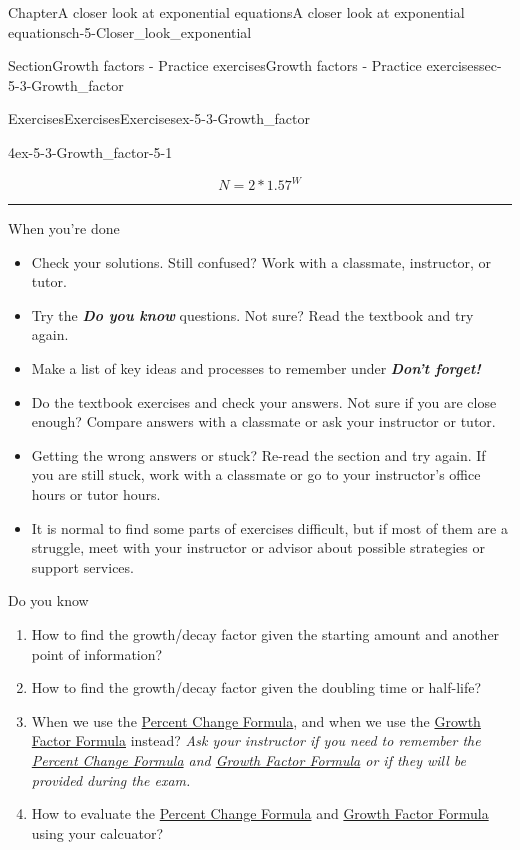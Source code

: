 \documentclass[twoside,11pt,]{book}
\newcommand{\alert}[1]{\textbf{\textit{#1}}}
\newlength{\workspacestrutwidth}
\numberwithin{equation}{section}
\begin{document}
\begin{chapterptx}{Chapter}{A closer look at exponential equations}{}{A closer look at exponential equations}{}{}{ch-5-Closer_look_exponential}
\begin{sectionptx}{Section}{Growth factors - Practice exercises}{}{Growth factors - Practice exercises}{}{}{sec-5-3-Growth_factor}
\begin{exercises-subsection-numberless}{Exercises}{Exercises}{}{Exercises}{}{}{ex-5-3-Growth_factor}
\begin{divisionexercise}{4}{}{}{ex-5-3-Growth_factor-5-1}
\begin{enumerate}[label=(\alph*),ref=\alph*]
\begin{equation*}
N = 2 \ast 1.57^W
\end{equation*}
%
\par\rule{\workspacestrutwidth}{1.5in}%
\end{enumerate}%
\end{divisionexercise}%
\end{exercises-subsection-numberless}
\begin{conclusion}{When you're done \textellipsis{}}%
%
\begin{itemize}[label=\textbullet]
\item{}Check your solutions. Still confused? Work with a classmate, instructor, or tutor.%
\item{}Try the \alert{Do you know} questions. Not sure? Read the textbook and try again.%
\item{}Make a list of key ideas and processes to remember under \alert{Don't forget!}%
\item{}Do the textbook exercises and check your answers. Not sure if you are close enough? Compare answers with a classmate or ask your instructor or tutor.%
\item{}Getting the wrong answers or stuck? Re-read the section and try again. If you are still stuck, work with a classmate or go to your instructor's office hours or tutor hours.%
\item{}It is normal to find some parts of exercises difficult, but if most of them are a struggle, meet with your instructor or advisor about possible strategies or support services.%
\end{itemize}
%
\end{conclusion}%
\begin{conclusion}{Do you know \textellipsis{}}%
%
\begin{enumerate}[label={\Alph*.}]
\item{}How to find the growth\slash{}decay factor given the starting amount and another point of information?%
\item{}How to find the growth\slash{}decay factor given the doubling time or half-life?%
\item{}When we use the \hyperref[percent-change-formula]{Percent Change Formula}, and when we use the \hyperref[growth-factor-formula]{Growth Factor Formula} instead? \emph{Ask your instructor if you need to remember the \hyperref[percent-change-formula]{Percent Change Formula} and \hyperref[growth-factor-formula]{Growth Factor Formula} or if they will be provided during the exam.}%
\item{}How to evaluate the \hyperref[percent-change-formula]{Percent Change Formula} and \hyperref[growth-factor-formula]{Growth Factor Formula} using your calcuator?%

\end{enumerate}
\end{conclusion}
\end{sectionptx}
\end{chapterptx}
\end{document}
